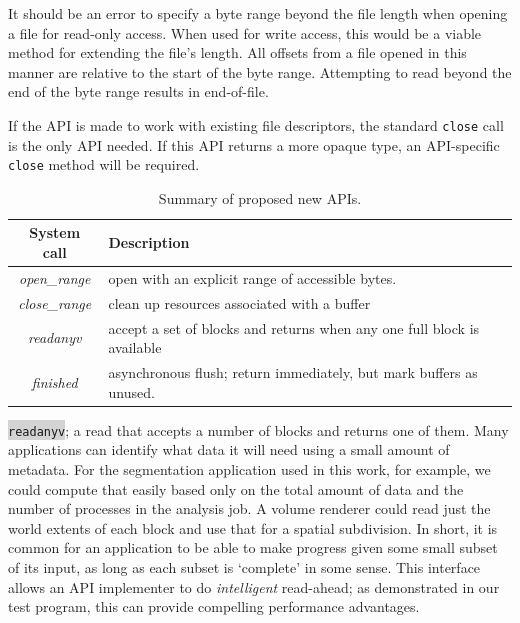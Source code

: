 It should be an error to specify a byte range beyond the file length
when opening a file for read-only access.  When used for write access,
this would be a viable method for extending the file's length.  All
offsets from a file opened in this manner are relative to the start of
the byte range.  Attempting to read beyond the end of the byte range
results in end-of-file.

If the API is made to work with existing file descriptors, the standard
\verb!close! call is the only API needed.  If this API returns a more
opaque type, an API-specific \verb!close! method will be required.


\begin{table}
  \centering
  \begin{tabular}{|c|l|}\hline
    \textbf{System call} & \textbf{Description}\\\hline
    \textit{open\_range} & open with an explicit range of accessible bytes.\\
    \textit{close\_range} & clean up resources associated with a
      buffer \\
    \textit{readanyv} & accept a set of blocks and returns when any one
      full block is available\\
    \textit{finished} & asynchronous flush; return immediately, but mark
      buffers as unused.\\\hline
  \end{tabular}
  \caption{Summary of proposed new APIs.}
  \label{tbl:api}
\end{table}

\colorbox{lightgray}{\texttt{readanyv}}; a read that accepts a number
of blocks and returns one of them.  Many applications can identify
what data it will need using a small amount of metadata.  For the
segmentation application used in this work, for example, we could
compute that easily based only on the total amount of data and the
number of processes in the analysis job.  A volume renderer could
read just the world extents of each block and use that for a spatial
subdivision.  In short, it is common for an application to be able to
make progress given some small subset of its input, as long as each
subset is `complete' in some sense.  This interface allows an API
implementer to do \emph{intelligent} read-ahead; as demonstrated in our
test program, this can provide compelling performance advantages.

